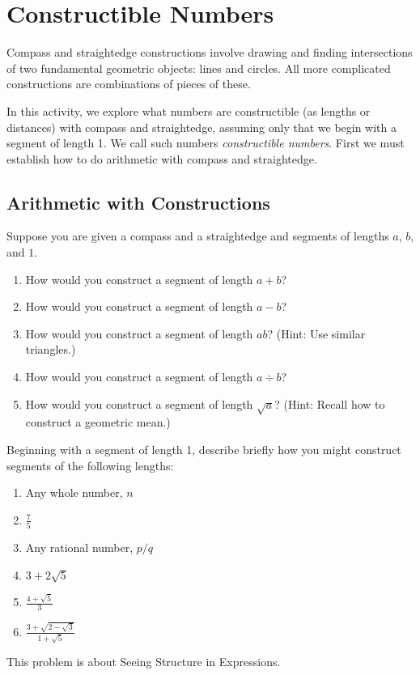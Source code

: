\newpage
\section{Constructible Numbers}
Compass and straightedge constructions involve drawing and finding intersections of two fundamental geometric objects:  lines and circles.  All more complicated constructions are combinations of pieces of these.  

In this activity, we explore what numbers are constructible (as lengths or distances) with compass and straightedge, assuming only that we begin with a segment of length 1.  We call such numbers \textit{constructible numbers}.  First we must establish how to do arithmetic with compass and straightedge.  

\subsection*{Arithmetic with Constructions}
\begin{prob}
Suppose you are given a compass and a straightedge and segments of lengths $a$, $b$, and $1$.  
\begin{enumerate}
\item How would you construct a segment of length $a+b$? 
\item How would you construct a segment of length $a-b$? 
\item How would you construct a segment of length $ab$?  (Hint:  Use similar triangles.)  
\item How would you construct a segment of length $a\div b$? 
\item How would you construct a segment of length $\sqrt{a}$?  (Hint: Recall how to construct a geometric mean.)  
\end{enumerate}
\end{prob}

\begin{prob}
Beginning with a segment of length 1, describe briefly how you might construct segments of the following lengths:
\begin{enumerate}
\item Any whole number, $n$
\item $\frac{7}{5}$
\item Any rational number, $p/q$
\item $3+2\sqrt{5}$
\item $\frac{4+\sqrt{5}}{3}$
\item $\frac{3 + \sqrt{2-\sqrt{3}}}{1+\sqrt{5}}$
\end{enumerate}
\end{prob}
\begin{teachingnote}
This problem is about Seeing Structure in Expressions.
\end{teachingnote}

